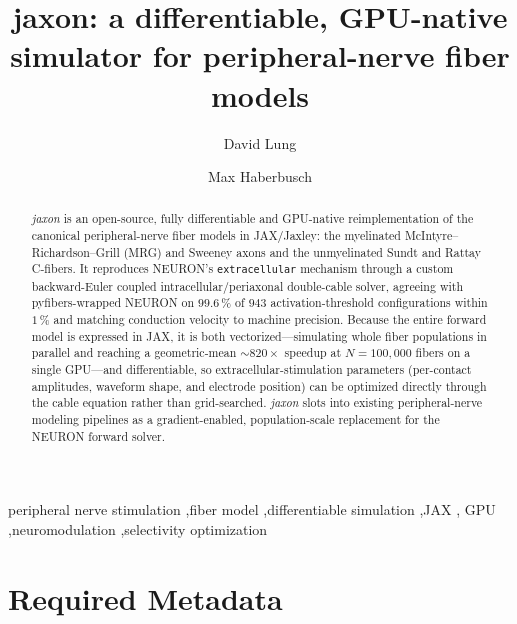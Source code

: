 \documentclass[preprint,12pt,a4paper]{elsarticle}
\begin{document}
\renewcommand{\labelenumii}{\arabic{enumi}.\arabic{enumii}}

\begin{frontmatter}

\title{jaxon: a differentiable, GPU-native simulator for peripheral-nerve fiber models}

\author[meduni]{David Lung}
\author[meduni,lbi]{Max Haberbusch}

\address[meduni]{Center for Medical Physics and Biomedical Engineering, Medical University of Vienna, Vienna, Austria}
\address[lbi]{Ludwig Boltzmann Institute for Cardiovascular Research, Vienna, Austria}

\begin{abstract}
\emph{jaxon} is an open-source, fully differentiable and GPU-native reimplementation of the
canonical peripheral-nerve fiber models in JAX/Jaxley: the myelinated
McIntyre--Richardson--Grill (MRG) and Sweeney axons and the unmyelinated Sundt and Rattay
C-fibers. It reproduces NEURON's \texttt{extracellular} mechanism through a custom
backward-Euler coupled intracellular/periaxonal double-cable solver, agreeing with
pyfibers-wrapped NEURON on $99.6\,\%$ of $943$ activation-threshold configurations within
$1\,\%$ and matching conduction velocity to machine precision. Because the entire forward
model is expressed in JAX, it is both vectorized---simulating whole fiber populations in
parallel and reaching a geometric-mean ${\sim}820\times$ speedup at $N=100{,}000$ fibers on
a single GPU---and differentiable, so extracellular-stimulation parameters (per-contact
amplitudes, waveform shape, and electrode position) can be optimized directly through the
cable equation rather than grid-searched. \emph{jaxon} slots into existing peripheral-nerve
modeling pipelines as a gradient-enabled, population-scale replacement for the NEURON
forward solver.
\end{abstract}

\begin{keyword}
peripheral nerve stimulation \sep fiber model \sep differentiable simulation \sep JAX \sep
GPU \sep neuromodulation \sep selectivity optimization
\end{keyword}

\end{frontmatter}


\section*{Required Metadata}
\end{document}
